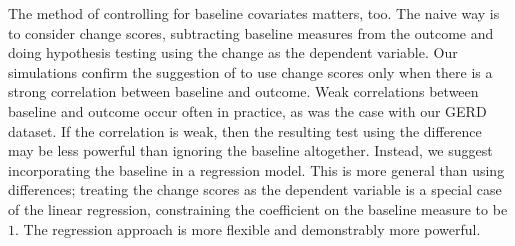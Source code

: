 \documentclass[11pt]{article}
\begin{document}
The method of controlling for baseline covariates matters, too.
The naive way is to consider change scores, subtracting baseline measures from the outcome and doing hypothesis testing using the change as the dependent variable.
Our simulations confirm the suggestion of \cite{frison_repeated_1992} to use change scores only when there is a strong correlation between baseline and outcome.
Weak correlations between baseline and outcome occur often in practice, as was the case with our GERD dataset.
If the correlation is weak, then the resulting test using the difference may be less powerful than ignoring the baseline altogether.
Instead, we suggest incorporating the baseline in a regression model.
This is more general than using differences;
treating the change scores as the dependent variable is a special case of the linear regression, constraining the coefficient on the baseline measure to be $1$.
The regression approach is more flexible and demonstrably more powerful.


%
%
%
\end{document}
